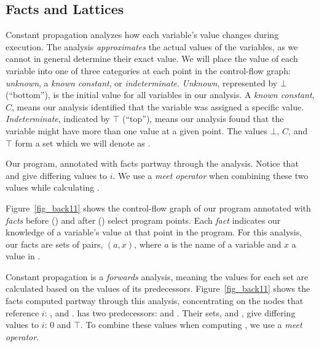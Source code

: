 \documentclass[12pt]{report}
\begin{document}
\subsection{Facts and Lattices} 
\label{back_subsec_facts}

Constant propagation analyzes how each variable's value changes during
execution. The analysis \emph{approximates} the actual values of the
variables, as we cannot in general determine their exact value. We
will place the value of each variable into one of three categories at
each point in the control-flow graph: \emph{unknown}, a \emph{known
  constant}, or \emph{indeterminate}. \emph{Unknown}, represented by
$\bot$ (``bottom''), is the initial value for all variables in our
analysis. A \emph{known constant}, $C$, means our analysis identified
that the variable was assigned a specific value. \emph{Indeterminate},
indicated by $\top$ (``top''), means our analysis found that the
variable might have more than one value at a given point. The values
$\bot$, $C$, and $\top$ form a set which we will denote as \setLC.

\begin{myfig}[bth]
  
  \caption{Our program, annotated with facts partway through the
    analysis. Notice that  and
     give differing values to $i$. We use a \emph{meet
      operator} when combining these two values while calculating
    .}
  \label{fig_back11}
\end{myfig}

Figure~\ref{fig_back11} shows the control-flow graph of our program
annotated with \emph{facts} before (\inE) and after (\out) select
program points. Each \emph{fact} indicates our knowledge of a
variable's value at that point in the program. For this analysis, our
facts are sets of pairs, $(a,x)$, where $a$ is the name of a variable
and $x$ a value in \setLC. 

Constant propagation is a \emph{forwards} analysis, meaning the values
for each \inE set are calculated based on the \out values of its
predecessors. Figure~\ref{fig_back11} shows the facts computed partway
through this analysis, concentrating on the nodes that reference $i$:
,  and
.  has two
predecessors:  and
. Their \out sets,
 and , give differing
values to $i$: 0 and $\top$. To combine these values when computing
, we use a \emph{meet operator}.
\end{document}
